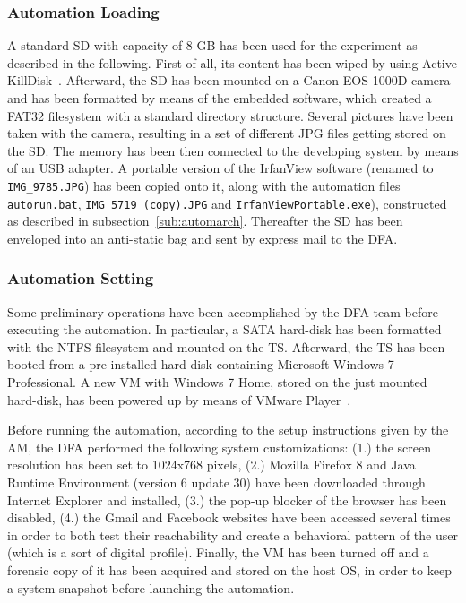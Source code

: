 \documentclass[10pt, conference]{IEEEtran}
\begin{document}
\subsubsection{Automation Loading}

A standard SD with capacity of 8 GB has been used for the experiment as described in the following. First of all, its content has been
wiped by using Active KillDisk~\cite{akd}. Afterward, the SD has been mounted on a Canon EOS 1000D camera and has been
formatted by means of the embedded software, which created a FAT32 filesystem with a standard directory structure.
Several pictures have been taken with the camera, resulting in a set of different JPG files getting stored on the SD. The memory
has been then connected to the developing system by means of an USB adapter. A portable version of the IrfanView software
(renamed to \verb=IMG_9785.JPG=) has been copied onto it, along with the automation files \verb=autorun.bat=,
\verb=IMG_5719 (copy).JPG= and \verb=IrfanViewPortable.exe=), constructed as described in subsection~\ref{sub:automarch}. 
Thereafter the SD has been enveloped into an anti-static bag and sent by express mail to the DFA.


\subsubsection{Automation Setting}

Some preliminary operations have been accomplished by the DFA team before executing the automation.
In particular, a SATA hard-disk has been formatted with the NTFS filesystem and mounted on the TS. 
Afterward, the TS has been booted from a pre-installed hard-disk containing Microsoft Windows 7 Professional. 
A new VM with Windows 7 Home, stored on the just mounted hard-disk, has been powered up by means of VMware Player~\cite{vmware}.

Before running the automation, according to the setup instructions given by the AM, the DFA performed the following system customizations: 
(1.) the screen resolution has been set to 1024x768 pixels, (2.) Mozilla Firefox 8 and Java Runtime Environment (version 6 update 30) have been downloaded through Internet Explorer and installed, (3.) the pop-up blocker of the browser has been disabled, (4.) the Gmail and Facebook websites have been accessed several times in order to both test their reachability and create a behavioral pattern of the user (which is a sort of digital profile).
Finally, the VM has been turned off and a forensic copy of it has been acquired and stored on the host OS, in order to keep a system snapshot before launching the automation. 
\end{document}
